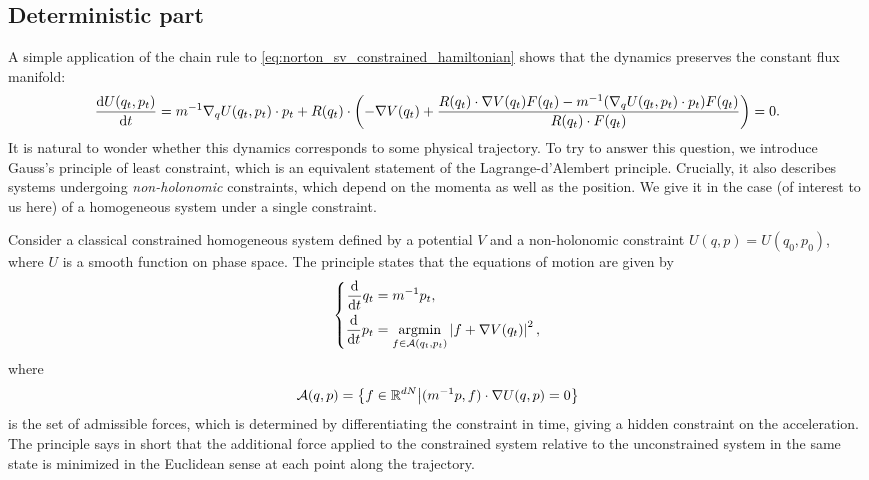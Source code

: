 \subsection{Deterministic part}
A simple application of the chain rule to \eqref{eq:norton_sv_constrained_hamiltonian} shows that the dynamics preserves the constant flux manifold:
\[\frac{\mathrm{d} U(q_t,p_t)}{\mathrm{d} t}=m^{-1}\nabla_q U(q_t,p_t)\cdot p_t+R(q_t)\cdot\left(-\nabla V(q_t)+\frac{R(q_t)\cdot \nabla V(q_t)F(q_t)-m^{-1}(\nabla_q U(q_t,p_t)\cdot p_t)F(q_t)}{R(q_t)\cdot F(q_t)}\right)=0.\]
It is natural to wonder whether this dynamics corresponds to some physical trajectory. To try to answer this question, we introduce Gauss's principle of least constraint, which is an equivalent statement of the Lagrange-d'Alembert principle. Crucially, it also describes systems undergoing \textit{non-holonomic} constraints, which depend on the momenta as well as the position.
We give it in the case (of interest to us here) of a homogeneous system under a single constraint.

\begin{definition}
    Consider a classical constrained homogeneous system defined by a potential $V$ and a non-holonomic constraint $U(q,p)=U(q_0,p_0)$, where $U$ is a smooth function on phase space. The principle states that the equations of motion are given by 
    \begin{equation}
        \left\{\begin{aligned}
        \frac{\mathrm{d}}{\mathrm{d}t}q_t&=m^{-1}p_t,\\
        \frac{\mathrm{d}}{\mathrm{d}t}p_t&=\operatorname*{argmin}_{f\in\mathcal A(q_t,p_t)} \left|f+\nabla V(q_t)\right|^2,
        \end{aligned}\right.
    \end{equation}
    where 
    \[\mathcal A(q,p)=\left\{f\in \mathbb{R}^{dN} \middle | (m^{-1}p,f)\cdot\nabla U(q,p)=0\right\}\] 
    is the set of admissible forces, which is determined by differentiating the constraint in time, giving a hidden constraint on the acceleration. The principle says in short that the additional force applied to the constrained system relative to the unconstrained system in the same state is minimized in the Euclidean sense at each point along the trajectory.
\end{definition}

